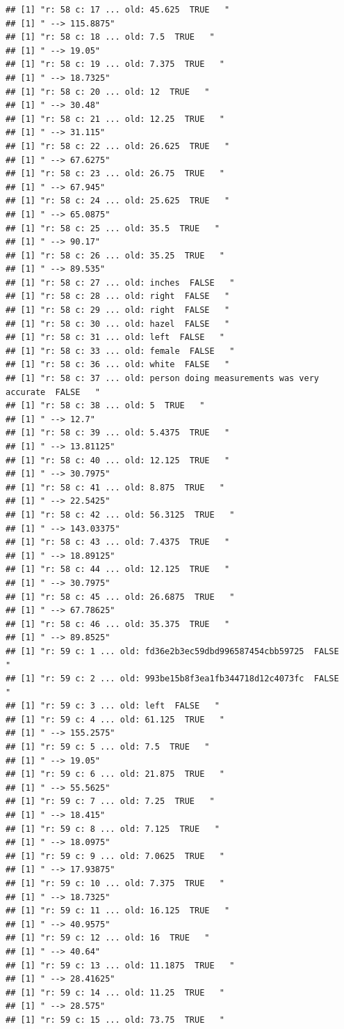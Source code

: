 \documentclass[]{article}
\begin{document}
\begin{verbatim}
## [1] "r: 58 c: 17 ... old: 45.625  TRUE   "
## [1] " --> 115.8875"
## [1] "r: 58 c: 18 ... old: 7.5  TRUE   "
## [1] " --> 19.05"
## [1] "r: 58 c: 19 ... old: 7.375  TRUE   "
## [1] " --> 18.7325"
## [1] "r: 58 c: 20 ... old: 12  TRUE   "
## [1] " --> 30.48"
## [1] "r: 58 c: 21 ... old: 12.25  TRUE   "
## [1] " --> 31.115"
## [1] "r: 58 c: 22 ... old: 26.625  TRUE   "
## [1] " --> 67.6275"
## [1] "r: 58 c: 23 ... old: 26.75  TRUE   "
## [1] " --> 67.945"
## [1] "r: 58 c: 24 ... old: 25.625  TRUE   "
## [1] " --> 65.0875"
## [1] "r: 58 c: 25 ... old: 35.5  TRUE   "
## [1] " --> 90.17"
## [1] "r: 58 c: 26 ... old: 35.25  TRUE   "
## [1] " --> 89.535"
## [1] "r: 58 c: 27 ... old: inches  FALSE   "
## [1] "r: 58 c: 28 ... old: right  FALSE   "
## [1] "r: 58 c: 29 ... old: right  FALSE   "
## [1] "r: 58 c: 30 ... old: hazel  FALSE   "
## [1] "r: 58 c: 31 ... old: left  FALSE   "
## [1] "r: 58 c: 33 ... old: female  FALSE   "
## [1] "r: 58 c: 36 ... old: white  FALSE   "
## [1] "r: 58 c: 37 ... old: person doing measurements was very accurate  FALSE   "
## [1] "r: 58 c: 38 ... old: 5  TRUE   "
## [1] " --> 12.7"
## [1] "r: 58 c: 39 ... old: 5.4375  TRUE   "
## [1] " --> 13.81125"
## [1] "r: 58 c: 40 ... old: 12.125  TRUE   "
## [1] " --> 30.7975"
## [1] "r: 58 c: 41 ... old: 8.875  TRUE   "
## [1] " --> 22.5425"
## [1] "r: 58 c: 42 ... old: 56.3125  TRUE   "
## [1] " --> 143.03375"
## [1] "r: 58 c: 43 ... old: 7.4375  TRUE   "
## [1] " --> 18.89125"
## [1] "r: 58 c: 44 ... old: 12.125  TRUE   "
## [1] " --> 30.7975"
## [1] "r: 58 c: 45 ... old: 26.6875  TRUE   "
## [1] " --> 67.78625"
## [1] "r: 58 c: 46 ... old: 35.375  TRUE   "
## [1] " --> 89.8525"
## [1] "r: 59 c: 1 ... old: fd36e2b3ec59dbd996587454cbb59725  FALSE   "
## [1] "r: 59 c: 2 ... old: 993be15b8f3ea1fb344718d12c4073fc  FALSE   "
## [1] "r: 59 c: 3 ... old: left  FALSE   "
## [1] "r: 59 c: 4 ... old: 61.125  TRUE   "
## [1] " --> 155.2575"
## [1] "r: 59 c: 5 ... old: 7.5  TRUE   "
## [1] " --> 19.05"
## [1] "r: 59 c: 6 ... old: 21.875  TRUE   "
## [1] " --> 55.5625"
## [1] "r: 59 c: 7 ... old: 7.25  TRUE   "
## [1] " --> 18.415"
## [1] "r: 59 c: 8 ... old: 7.125  TRUE   "
## [1] " --> 18.0975"
## [1] "r: 59 c: 9 ... old: 7.0625  TRUE   "
## [1] " --> 17.93875"
## [1] "r: 59 c: 10 ... old: 7.375  TRUE   "
## [1] " --> 18.7325"
## [1] "r: 59 c: 11 ... old: 16.125  TRUE   "
## [1] " --> 40.9575"
## [1] "r: 59 c: 12 ... old: 16  TRUE   "
## [1] " --> 40.64"
## [1] "r: 59 c: 13 ... old: 11.1875  TRUE   "
## [1] " --> 28.41625"
## [1] "r: 59 c: 14 ... old: 11.25  TRUE   "
## [1] " --> 28.575"
## [1] "r: 59 c: 15 ... old: 73.75  TRUE   "

\end{verbatim}
\end{document}
